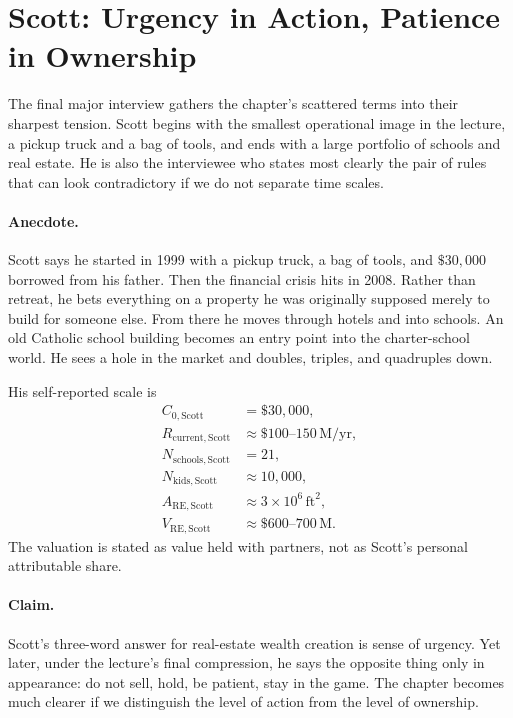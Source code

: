 \section{Scott: Urgency in Action, Patience in Ownership}

The final major interview gathers the chapter's scattered terms into their sharpest tension. Scott begins with the smallest operational image in the lecture, a pickup truck and a bag of tools, and ends with a large portfolio of schools and real estate. He is also the interviewee who states most clearly the pair of rules that can look contradictory if we do not separate time scales.

\paragraph{Anecdote.}
Scott says he started in 1999 with a pickup truck, a bag of tools, and \(\$30{,}000\) borrowed from his father. Then the financial crisis hits in 2008. Rather than retreat, he bets everything on a property he was originally supposed merely to build for someone else. From there he moves through hotels and into schools. An old Catholic school building becomes an entry point into the charter-school world. He sees a hole in the market and doubles, triples, and quadruples down.

His self-reported scale is
\begin{align}
C_{0,\mathrm{Scott}} &= \$30{,}000,\\
R_{\mathrm{current,Scott}} &\approx \$100\text{--}150\,\mathrm{M/yr},\\
N_{\mathrm{schools,Scott}} &= 21,\\
N_{\mathrm{kids,Scott}} &\approx 10{,}000,\\
A_{\mathrm{RE,Scott}} &\approx 3\times 10^6\,\mathrm{ft}^2,\\
V_{\mathrm{RE,Scott}} &\approx \$600\text{--}700\,\mathrm{M}.
\end{align}
The valuation is stated as value held with partners, not as Scott's personal attributable share.

\paragraph{Claim.}
Scott's three-word answer for real-estate wealth creation is sense of urgency. Yet later, under the lecture's final compression, he says the opposite thing only in appearance: do not sell, hold, be patient, stay in the game. The chapter becomes much clearer if we distinguish the level of action from the level of ownership.

